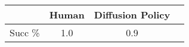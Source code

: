 \begin{tabular}{c|c|c|c}
\toprule
        & Human & Diffusion Policy \\
\midrule
Succ \% & 1.0   & 0.9             \\
\bottomrule
\end{tabular}
